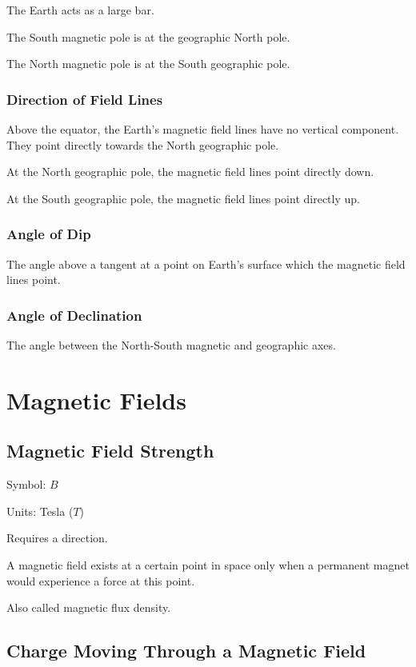 \documentclass[a4paper,11pt]{report}
\begin{document}
The Earth acts as a large bar.

The South magnetic pole is at the geographic North pole.

The North magnetic pole is at the South geographic pole.

\subsubsection{Direction of Field Lines}

Above the equator, the Earth's magnetic field lines have no vertical component.
They point directly towards the North geographic pole.

At the North geographic pole, the magnetic field lines point directly down.

At the South geographic pole, the magnetic field lines point directly up.

\subsubsection{Angle of Dip}

The angle above a tangent at a point on Earth's surface which the magnetic
field lines point.

\subsubsection{Angle of Declination}

The angle between the North-South magnetic and geographic axes.


\section{Magnetic Fields}

\subsection{Magnetic Field Strength}

Symbol: $B$

Units: Tesla ($T$)

Requires a direction.

A magnetic field exists at a certain point in space only when a permanent
magnet would experience a force at this point.

Also called magnetic flux density.

\subsection{Charge Moving Through a Magnetic Field}
\end{document}
